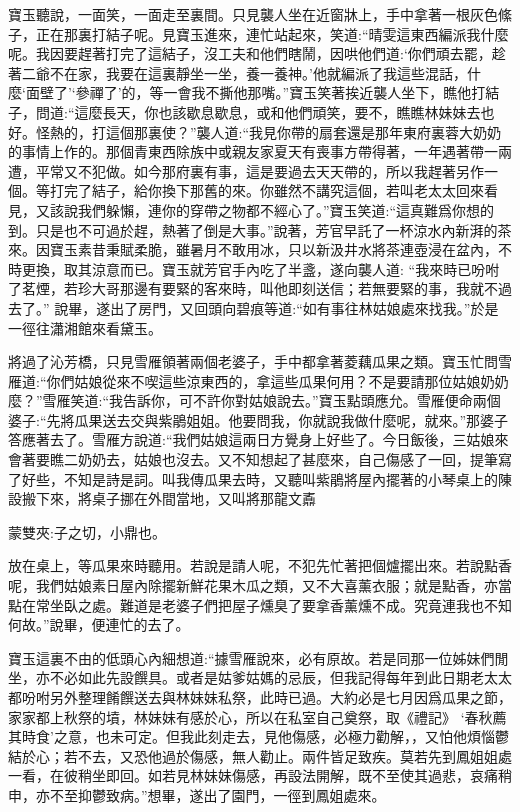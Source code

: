 \begin{parag}
    寶玉聽說，一面笑，一面走至裏間。只見襲人坐在近窗牀上，手中拿著一根灰色絛子，正在那裏打結子呢。見寶玉進來，連忙站起來，笑道:“晴雯這東西編派我什麼呢。我因要趕著打完了這結子，沒工夫和他們瞎鬧，因哄他們道:‘你們頑去罷，趁著二爺不在家，我要在這裏靜坐一坐，養一養神。’他就編派了我這些混話，什麼‘面壁了’‘參禪了’的，等一會我不撕他那嘴。”寶玉笑著挨近襲人坐下，瞧他打結子，問道:“這麼長天，你也該歇息歇息，或和他們頑笑，要不，瞧瞧林妹妹去也好。怪熱的，打這個那裏使？”襲人道:“我見你帶的扇套還是那年東府裏蓉大奶奶的事情上作的。那個青東西除族中或親友家夏天有喪事方帶得著，一年遇著帶一兩遭，平常又不犯做。如今那府裏有事，這是要過去天天帶的，所以我趕著另作一個。等打完了結子，給你換下那舊的來。你雖然不講究這個，若叫老太太回來看見，又該說我們躲懶，連你的穿帶之物都不經心了。”寶玉笑道:“這真難爲你想的到。只是也不可過於趕，熱著了倒是大事。”說著，芳官早託了一杯涼水內新湃的茶來。因寶玉素昔秉賦柔脆，雖暑月不敢用冰，只以新汲井水將茶連壺浸在盆內，不時更換，取其涼意而已。寶玉就芳官手內吃了半盞，遂向襲人道: “我來時已吩咐了茗煙，若珍大哥那邊有要緊的客來時，叫他即刻送信；若無要緊的事，我就不過去了。” 說畢，遂出了房門，又回頭向碧痕等道:“如有事往林姑娘處來找我。”於是一徑往瀟湘館來看黛玉。
\end{parag}


\begin{parag}
    將過了沁芳橋，只見雪雁領著兩個老婆子，手中都拿著菱藕瓜果之類。寶玉忙問雪雁道:“你們姑娘從來不喫這些涼東西的，拿這些瓜果何用？不是要請那位姑娘奶奶麼？”雪雁笑道:“我告訴你，可不許你對姑娘說去。”寶玉點頭應允。雪雁便命兩個婆子:“先將瓜果送去交與紫鵑姐姐。他要問我，你就說我做什麼呢，就來。”那婆子答應著去了。雪雁方說道:“我們姑娘這兩日方覺身上好些了。今日飯後，三姑娘來會著要瞧二奶奶去，姑娘也沒去。又不知想起了甚麼來，自己傷感了一回，提筆寫了好些，不知是詩是詞。叫我傳瓜果去時，又聽叫紫鵑將屋內擺著的小琴桌上的陳設搬下來，將桌子挪在外間當地，又叫將那龍文鼒\begin{note}蒙雙夾:子之切，小鼎也。\end{note}放在桌上，等瓜果來時聽用。若說是請人呢，不犯先忙著把個爐擺出來。若說點香呢，我們姑娘素日屋內除擺新鮮花果木瓜之類，又不大喜薰衣服；就是點香，亦當點在常坐臥之處。難道是老婆子們把屋子燻臭了要拿香薰燻不成。究竟連我也不知何故。”說畢，便連忙的去了。
\end{parag}


\begin{parag}
    寶玉這裏不由的低頭心內細想道:“據雪雁說來，必有原故。若是同那一位姊妹們閒坐，亦不必如此先設饌具。或者是姑爹姑媽的忌辰，但我記得每年到此日期老太太都吩咐另外整理餚饌送去與林妹妹私祭，此時已過。大約必是七月因爲瓜果之節，家家都上秋祭的墳，林妹妹有感於心，所以在私室自己奠祭，取《禮記》 ‘春秋薦其時食’之意，也未可定。但我此刻走去，見他傷感，必極力勸解，，又怕他煩惱鬱結於心；若不去，又恐他過於傷感，無人勸止。兩件皆足致疾。莫若先到鳳姐姐處一看，在彼稍坐即回。如若見林妹妹傷感，再設法開解，既不至使其過悲，哀痛稍申，亦不至抑鬱致病。”想畢，遂出了園門，一徑到鳳姐處來。
\end{parag}


